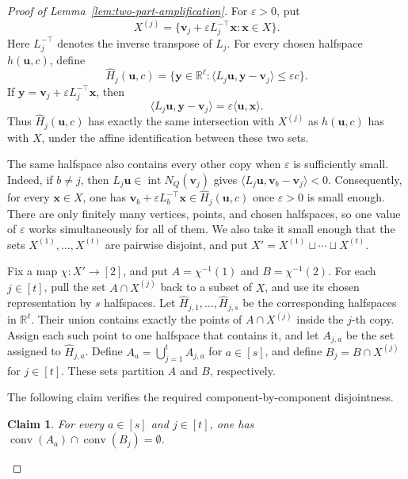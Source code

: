 \documentclass[10pt,a4paper]{amsart}
\newtheorem{claim}{Claim}
\newcommand{\R}{\mathbb{R}}
\begin{document}
\begin{proof}[Proof of Lemma~\ref{lem:two-part-amplification}]
For \(\varepsilon>0\), put
\[
X^{(j)}=\{\boldsymbol{v}_{j}+\varepsilon L_{j}^{-\top}\boldsymbol{x}:\boldsymbol{x}\in X\}.
\]
Here \(L_{j}^{-\top}\) denotes the inverse transpose of \(L_{j}\).
For every chosen halfspace \(h(\boldsymbol{u},c)\), define
\[
\widehat H_{j}(\boldsymbol{u},c)=\{\boldsymbol{y}\in\R^{\ell}:\langle L_{j}\boldsymbol{u},\boldsymbol{y}-\boldsymbol{v}_{j}\rangle\le\varepsilon c\}.
\]
If \(\boldsymbol{y}=\boldsymbol{v}_{j}+\varepsilon L_{j}^{-\top}\boldsymbol{x}\), then
\[
\langle L_{j}\boldsymbol{u},\boldsymbol{y}-\boldsymbol{v}_{j}\rangle=\varepsilon\langle\boldsymbol{u},\boldsymbol{x}\rangle.
\]
Thus \(\widehat H_{j}(\boldsymbol{u},c)\) has exactly the same intersection with \(X^{(j)}\) as \(h(\boldsymbol{u},c)\) has with \(X\), under the affine identification between these two sets.

The same halfspace also contains every other copy when \(\varepsilon\) is sufficiently small. Indeed, if \(b\ne j\), then \(L_{j}\boldsymbol{u}\in\operatorname{int}N_{Q}(\boldsymbol{v}_{j})\) gives
\(
\langle L_{j}\boldsymbol{u},\boldsymbol{v}_{b}-\boldsymbol{v}_{j}\rangle<0.
\)
Consequently, for every \(\boldsymbol{x}\in X\), one has \(\boldsymbol{v}_{b}+\varepsilon L_{b}^{-\top}\boldsymbol{x}\in\widehat H_{j}(\boldsymbol{u},c)\) once \(\varepsilon>0\) is small enough. There are only finitely many vertices, points, and chosen halfspaces, so one value of \(\varepsilon\) works simultaneously for all of them. We also take it small enough that the sets \(X^{(1)},\ldots,X^{(t)}\) are pairwise disjoint, and put \(X'=X^{(1)}\sqcup\cdots\sqcup X^{(t)}\).

Fix a map \(\chi:X'\to[2]\), and put \(A=\chi^{-1}(1)\) and \(B=\chi^{-1}(2)\). For each \(j\in[t]\), pull the set \(A\cap X^{(j)}\) back to a subset of \(X\), and use its chosen representation by \(s\) halfspaces. Let \(\widehat H_{j,1},\ldots,\widehat H_{j,s}\) be the corresponding halfspaces in \(\R^{\ell}\). Their union contains exactly the points of \(A\cap X^{(j)}\) inside the \(j\)-th copy. Assign each such point to one halfspace that contains it, and let \(A_{j,a}\) be the set assigned to \(\widehat H_{j,a}\). Define \(A_{a}=\bigcup_{j=1}^{t}A_{j,a}\) for \(a\in[s]\), and define \(B_{j}=B\cap X^{(j)}\) for \(j\in[t]\). These sets partition \(A\) and \(B\), respectively.

The following claim verifies the required component-by-component disjointness.

\begin{claim}\label{claim:two-part-disjoint}
For every \(a\in[s]\) and \(j\in[t]\), one has \(\operatorname{conv}(A_{a})\cap\operatorname{conv}(B_{j})=\emptyset\).
\end{claim}


\end{proof}
\end{document}
